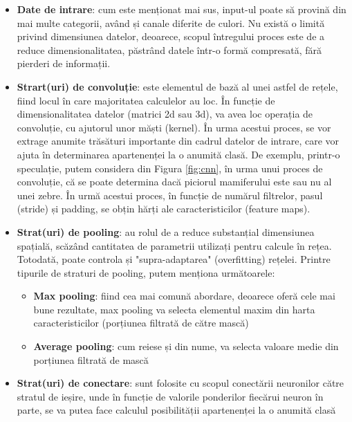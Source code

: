 \documentclass[a4paper, 12pt]{report}
\begin{document}
	\begin{itemize}
		\item \textbf{Date de intrare}: cum este menționat mai sus, input-ul poate să provină din mai multe categorii, având și canale diferite de culori. Nu există o limită privind dimensiunea datelor, deoarece, scopul întregului proces este de a reduce dimensionalitatea, păstrând datele într-o formă compresată, fără pierderi de informații.
		\item \textbf{Strart(uri) de convoluție}: este elementul de bază al unei astfel de rețele, fiind locul în care majoritatea calculelor au loc. În funcție de dimensionalitatea datelor (matrici 2d sau 3d), va avea loc operația de convoluție, cu ajutorul unor măști (kernel). În urma acestui proces, se vor extrage anumite trăsături importante din cadrul datelor de intrare, care vor ajuta în determinarea apartenenței la o anumită clasă. De exemplu, printr-o speculație, putem considera din Figura \ref{fig:cnn}, în urma unui proces de convoluție, că se poate determina dacă piciorul mamiferului este sau nu al unei zebre. În urmă acestui proces, în funcție de numărul filtrelor, pasul (stride) și padding, se obțin hărți ale caracteristicilor (feature maps).
		\item \textbf{Strat(uri) de pooling}: au rolul de a reduce substanțial dimensiunea spațială, scăzând cantitatea de parametrii utilizați pentru calcule în rețea. Totodată, poate controla și "supra-adaptarea" (overfitting) rețelei. Printre tipurile de straturi de pooling, putem menționa următoarele:
		\begin{itemize}
			\item \textbf{Max pooling}: fiind cea mai comună abordare, deoarece oferă cele mai bune rezultate, max pooling va selecta elementul maxim din harta caracteristicilor (porțiunea filtrată de către mască)
			\item \textbf{Average pooling}: cum reiese și din nume, va selecta valoare medie din porțiunea filtrată de mască
		\end{itemize}
		\item \textbf{Strat(uri) de conectare}: sunt folosite cu scopul conectării neuronilor către stratul de ieșire, unde în funcție de valorile ponderilor fiecărui neuron în parte, se va putea face calculul posibilității apartenenței la o anumită clasă
	\end{itemize} 
	
\end{document}
